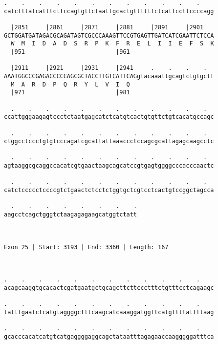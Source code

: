 \documentclass{article}
\begin{document}
\begin{Verbatim}
.    .    .    .    .    .    .    .    .    .    .    .    
catctttatcatttcttccagtgttctaattgcactgttttttctcattccttccccagg
                                                            
  |2851     |2861     |2871     |2881     |2891     |2901   
GCTGGATGATAGACGCAGATAGTCGCCCAAAGTTCCGTGAGTTGATCATCGAATTCTCCA
  W  M  I  D  A  D  S  R  P  K  F  R  E  L  I  I  E  F  S  K
  |951                          |961                        
  
  |2911     |2921     |2931     |2941     .    .    .    .  
AAATGGCCCGAGACCCCCAGCGCTACCTTGTCATTCAGgtacaaattgcagtctgtgctt
  M  A  R  D  P  Q  R  Y  L  V  I  Q                        
  |971                          |981                        
  
  .    .    .    .    .    .    .    .    .    .    .    .  
ccattgggaagagtccctctaatgagcatctcatgtcactgtgttctgtcacatgccagc
                                                            
  .    .    .    .    .    .    .    .    .    .    .    .  
ctggcctccctgtgtcccagatcgcattattaaaccctccagcgcattagagcaagcctc
                                                            
  .    .    .    .    .    .    .    .    .    .    .    .  
agtaaggcgcaggccacatcgtgaactaagcagcatccgtgagtggggcccacccaactc
                                                            
  .    .    .    .    .    .    .    .    .    .    .    .  
catctccccctccccgtctgaactctcctctggtgctcgtcctcactgtccggctagcca
                                                            
  .    .    .    .    .    .    .    .
aagcctcagctgggtctaagagagaagcatggtctatt
                                      
                                      
 
Exon 25 | Start: 3193 | End: 3360 | Length: 167



.    .    .    .    .    .    .    .    .    .    .    .    
acagcaaggtgcacactcgatgaatgctgcagcttcttccctttctgtttcctcagaagc
                                                            
.    .    .    .    .    .    .    .    .    .    .    .    
tatttgaatctcatgtaggggctttcaagcatcaaaggatggttcatgttttattttaag
                                                            
.    .    .    .    .    .    .    .    .    .    .    .    
gcacccacatcatgtcatgaggggaggcagctataatttagagaaccaagggggatttca
                                                            

\end{Verbatim}
\end{document}
